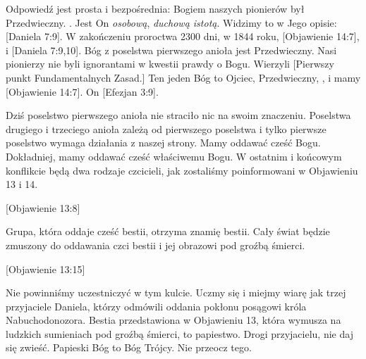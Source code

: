 Odpowiedź jest prosta i bezpośrednia: Bogiem naszych pionierów był Przedwieczny. . Jest On \textit{osobową}, \textit{duchową istotą}. Widzimy to w Jego opisie: [Daniela 7:9]. W zakończeniu proroctwa 2300 dni, w 1844 roku, [Objawienie 14:7],  i [Daniela 7:9,10]. Bóg z poselstwa pierwszego anioła jest Przedwieczny. Nasi pionierzy nie byli ignorantami w kwestii prawdy o Bogu. Wierzyli [Pierwszy punkt Fundamentalnych Zasad.] Ten jeden Bóg to Ojciec, Przedwieczny, , i mamy [Objawienie 14:7]. On [Efezjan 3:9].

Dziś poselstwo pierwszego anioła nie straciło nic na swoim znaczeniu. Poselstwa drugiego i trzeciego anioła zależą od pierwszego poselstwa i tylko pierwsze poselstwo wymaga działania z naszej strony. Mamy oddawać cześć Bogu. Dokładniej, mamy oddawać cześć właściwemu Bogu. W ostatnim i końcowym konflikcie będą dwa rodzaje czcicieli, jak zostaliśmy poinformowani w Objawieniu 13 i 14.

[Objawienie 13:8]

Grupa, która oddaje cześć bestii, otrzyma znamię bestii. Cały świat będzie zmuszony do oddawania czci bestii i jej obrazowi pod groźbą śmierci.

[Objawienie 13:15]

Nie powinniśmy uczestniczyć w tym kulcie. Uczmy się i miejmy wiarę jak trzej przyjaciele Daniela, którzy odmówili oddania pokłonu posągowi króla Nabuchodonozora. Bestia przedstawiona w Objawieniu 13, która wymusza na ludzkich sumieniach pod groźbą śmierci, to papiestwo. Drogi przyjacielu, nie daj się zwieść. Papieski Bóg to Bóg Trójcy. Nie przeocz tego.

